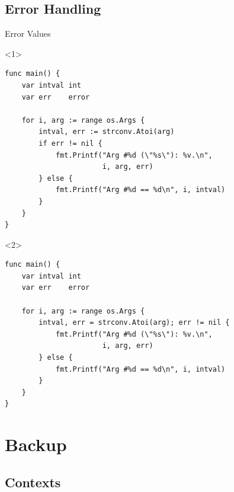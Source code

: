 \documentclass[pdf]{beamer}
\begin{document}
\subsection{Error Handling}
\begin{frame}[fragile]{Error Values}
\begin{onlyenv}<1>
\begin{lstlisting}
func main() {
    var intval int
    var err    error

    for i, arg := range os.Args {
        intval, err := strconv.Atoi(arg)
        if err != nil {
            fmt.Printf("Arg #%d (\"%s\"): %v.\n",
                       i, arg, err)
        } else {
            fmt.Printf("Arg #%d == %d\n", i, intval)
        }
    }
}
\end{lstlisting}
\end{onlyenv}
\begin{onlyenv}<2>
\begin{lstlisting}
func main() {
    var intval int
    var err    error

    for i, arg := range os.Args {
        intval, err = strconv.Atoi(arg); err != nil {
            fmt.Printf("Arg #%d (\"%s\"): %v.\n",
                       i, arg, err)
        } else {
            fmt.Printf("Arg #%d == %d\n", i, intval)
        }
    }
}
\end{lstlisting}
\end{onlyenv}
\end{frame}

\section{Backup}
\subsection{Contexts}

%
\end{document}
